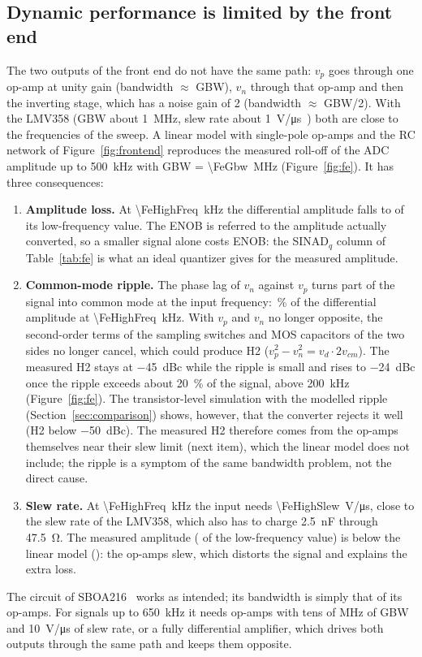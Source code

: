 \subsection{Dynamic performance is limited by the front end}
The two outputs of the front end do not have the same path: $v_p$ goes through one op-amp at
unity gain (bandwidth $\approx$ GBW), $v_n$ through that op-amp and then the inverting stage, which
has a noise gain of 2 (bandwidth $\approx$ GBW/2). With the LMV358 (GBW about \SI{1}{MHz}, slew rate
about \SI{1}{V/\micro s}~\cite{lmv358}) both are close to the frequencies of the sweep. A linear
model with single-pole op-amps and the RC network of Figure~\ref{fig:frontend} reproduces the
measured roll-off of the ADC amplitude up to \SI{500}{kHz} with GBW = \SI{\FeGbw}{MHz}
(Figure~\ref{fig:fe}). It has three consequences:
\begin{enumerate}
  \item \textbf{Amplitude loss.} At \SI{\FeHighFreq}{kHz} the differential amplitude falls to
        \FeHighRel{} of its low-frequency value. The ENOB is referred to the amplitude actually
        converted, so a smaller signal alone costs ENOB: the SINAD$_q$ column of
        Table~\ref{tab:fe} is what an ideal quantizer gives for the measured amplitude.
  \item \textbf{Common-mode ripple.} The phase lag of $v_n$ against $v_p$ turns part of the signal
        into common mode at the input frequency: \FeHighCm\,\% of the differential amplitude at
        \SI{\FeHighFreq}{kHz}. With $v_p$ and $v_n$ no longer opposite, the second-order terms of the
        sampling switches and MOS capacitors of the two sides no longer cancel, which could produce H2
        ($v_p^2 - v_n^2 = v_d \cdot 2 v_{cm}$). The measured H2 stays at \SI{-45}{dBc} while the
        ripple is small and rises to \SI{-24}{dBc} once the ripple exceeds about \SI{20}{\percent} of
        the signal, above \SI{200}{kHz} (Figure~\ref{fig:fe}). The transistor-level simulation with the
        modelled ripple (Section~\ref{sec:comparison}) shows, however, that the converter rejects it
        well (H2 below \SI{-50}{dBc}). The measured H2 therefore comes from the op-amps themselves
        near their slew limit (next item), which the linear model does not include; the ripple is a
        symptom of the same bandwidth problem, not the direct cause.
  \item \textbf{Slew rate.} At \SI{\FeHighFreq}{kHz} the input needs \SI{\FeHighSlew}{V/\micro s},
        close to the slew rate of the LMV358, which also has to charge \SI{2.5}{nF} through
        \SI{47.5}{\ohm}. The measured amplitude (\FeHighRel{} of the low-frequency value) is below
        the linear model (\FeHighModel): the op-amps slew, which distorts the signal and explains
        the extra loss.
\end{enumerate}
The circuit of SBOA216~\cite{sboa216} works as intended; its bandwidth is simply that of its
op-amps. For signals up to \SI{650}{kHz} it needs op-amps with tens of MHz of GBW and
\SI{10}{V/\micro s} of slew rate, or a fully differential amplifier, which drives both outputs
through the same path and keeps them opposite.

